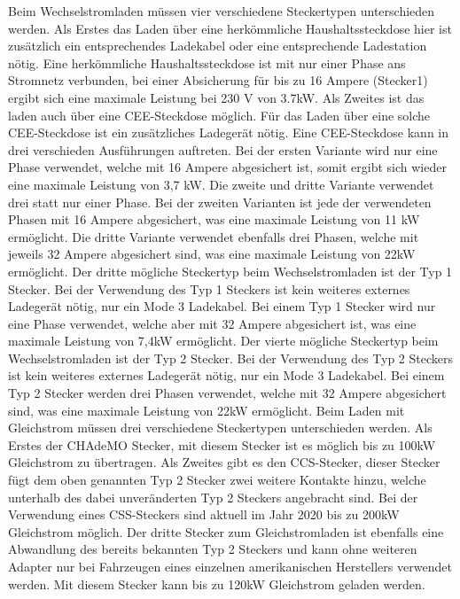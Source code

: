 Beim Wechselstromladen müssen vier verschiedene Steckertypen unterschieden werden. Als Erstes das Laden über eine herkömmliche Haushaltssteckdose hier ist zusätzlich ein entsprechendes Ladekabel oder eine entsprechende Ladestation nötig. Eine herkömmliche Haushaltssteckdose ist mit nur einer Phase ans Stromnetz verbunden, bei einer Absicherung für bis zu 16 Ampere (Stecker1) ergibt sich eine maximale Leistung bei 230 V von 3.7kW. Als Zweites ist das laden auch über eine CEE-Steckdose möglich. Für das Laden über eine solche CEE-Steckdose ist ein zusätzliches Ladegerät nötig. Eine CEE-Steckdose kann in drei verschieden Ausführungen auftreten. Bei der ersten Variante wird nur eine Phase verwendet, welche mit 16 Ampere abgesichert ist, somit ergibt sich wieder eine maximale Leistung von 3,7 kW. Die zweite und dritte Variante verwendet drei statt nur einer Phase. Bei der zweiten Varianten ist jede der verwendeten Phasen mit 16 Ampere abgesichert, was eine maximale Leistung von 11 kW ermöglicht. Die dritte Variante verwendet ebenfalls drei Phasen, welche mit jeweils 32 Ampere abgesichert sind, was eine maximale Leistung von 22kW ermöglicht. Der dritte mögliche Steckertyp beim Wechselstromladen ist der Typ 1 Stecker. Bei der Verwendung des Typ 1 Steckers ist kein weiteres externes Ladegerät nötig, nur ein Mode 3 Ladekabel. Bei einem Typ 1 Stecker wird nur eine Phase verwendet, welche aber mit 32 Ampere abgesichert ist, was eine maximale Leistung von 7,4kW ermöglicht. Der vierte mögliche Steckertyp beim Wechselstromladen ist der Typ 2 Stecker. Bei der Verwendung des Typ 2 Steckers ist kein weiteres externes Ladegerät nötig, nur ein Mode 3 Ladekabel. Bei einem Typ 2 Stecker werden drei Phasen verwendet, welche mit 32 Ampere abgesichert sind, was eine maximale Leistung von 22kW ermöglicht. Beim Laden mit Gleichstrom müssen drei verschiedene Steckertypen unterschieden werden. Als Erstes der CHAdeMO Stecker, mit diesem Stecker ist es möglich bis zu 100kW Gleichstrom zu übertragen. Als Zweites gibt es den CCS-Stecker, dieser Stecker fügt dem oben genannten Typ 2 Stecker zwei weitere Kontakte hinzu, welche unterhalb des dabei unveränderten Typ 2 Steckers angebracht sind. Bei der Verwendung eines CSS-Steckers sind aktuell im Jahr 2020 bis zu 200kW Gleichstrom möglich. Der dritte Stecker zum Gleichstromladen ist ebenfalls eine Abwandlung des bereits bekannten Typ 2 Steckers und kann ohne weiteren Adapter nur bei Fahrzeugen eines einzelnen amerikanischen Herstellers verwendet werden. Mit diesem Stecker kann bis zu 120kW Gleichstrom geladen werden.



